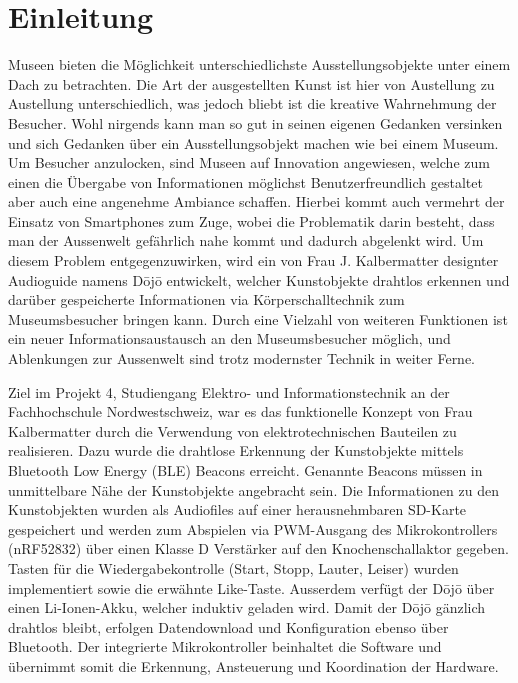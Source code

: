 \section{Einleitung}\label{sec:einleitung}

Museen bieten die Möglichkeit unterschiedlichste Ausstellungsobjekte unter einem Dach zu betrachten. Die Art der ausgestellten Kunst ist hier von Austellung zu Austellung unterschiedlich, was jedoch bliebt ist die kreative Wahrnehmung der Besucher. Wohl nirgends kann man so gut in seinen eigenen Gedanken versinken und sich Gedanken über ein Ausstellungsobjekt machen wie bei einem Museum. Um Besucher anzulocken, sind Museen auf Innovation angewiesen, welche zum einen die Übergabe von Informationen möglichst Benutzerfreundlich gestaltet aber auch eine angenehme Ambiance schaffen. Hierbei kommt auch vermehrt der Einsatz von Smartphones zum Zuge, wobei die Problematik darin besteht, dass man der Aussenwelt gefährlich nahe kommt und dadurch abgelenkt wird. Um diesem Problem entgegenzuwirken, wird ein von Frau J. Kalbermatter designter Audioguide namens Dōjō entwickelt, welcher Kunstobjekte drahtlos erkennen und darüber gespeicherte Informationen via Körperschalltechnik zum Museumsbesucher bringen kann. Durch eine Vielzahl von weiteren Funktionen ist ein neuer Informationsaustausch an den Museumsbesucher möglich, und Ablenkungen zur Aussenwelt sind trotz modernster Technik in weiter Ferne.
 
Ziel im Projekt 4, Studiengang Elektro- und Informationstechnik an der Fachhochschule Nordwestschweiz, war es das funktionelle Konzept von Frau Kalbermatter durch die Verwendung von elektrotechnischen Bauteilen zu realisieren. Dazu wurde die drahtlose Erkennung der Kunstobjekte mittels Bluetooth Low Energy (BLE) Beacons erreicht. Genannte Beacons müssen in unmittelbare Nähe der Kunstobjekte angebracht sein. Die Informationen zu den Kunstobjekten wurden als Audiofiles auf einer herausnehmbaren SD-Karte gespeichert und werden zum Abspielen via PWM-Ausgang des Mikrokontrollers (nRF52832) über einen Klasse D Verstärker auf den Knochenschallaktor gegeben. Tasten für die Wiedergabekontrolle (Start, Stopp, Lauter, Leiser) wurden implementiert sowie die erwähnte \glqq Like\grqq -Taste. Ausserdem verfügt der Dōjō über einen Li-Ionen-Akku, welcher induktiv geladen wird. Damit der Dōjō gänzlich drahtlos bleibt, erfolgen Datendownload und Konfiguration ebenso über Bluetooth. Der integrierte Mikrokontroller beinhaltet die Software und übernimmt somit die Erkennung, Ansteuerung und Koordination der Hardware.
 
